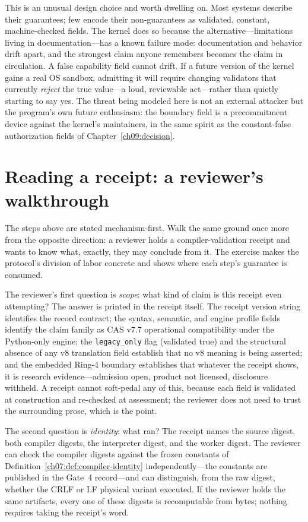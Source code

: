 This is an unusual design choice and worth dwelling on. Most systems describe their guarantees; few encode their non-guarantees as validated, constant, machine-checked fields. The kernel does so because the alternative---limitations living in documentation---has a known failure mode: documentation and behavior drift apart, and the strongest claim anyone remembers becomes the claim in circulation. A false capability field cannot drift. If a future version of the kernel gains a real OS sandbox, admitting it will require changing validators that currently \emph{reject} the true value---a loud, reviewable act---rather than quietly starting to say yes. The threat being modeled here is not an external attacker but the program's own future enthusiasm: the boundary field is a precommitment device against the kernel's maintainers, in the same spirit as the constant-false authorization fields of Chapter~\ref{ch09:decision}.

\section{Reading a receipt: a reviewer's walkthrough}\label{ch07:walkthrough}

The steps above are stated mechanism-first. Walk the same ground once more from the opposite direction: a reviewer holds a compiler-validation receipt and wants to know what, exactly, they may conclude from it. The exercise makes the protocol's division of labor concrete and shows where each step's guarantee is consumed.

The reviewer's first question is \emph{scope}: what kind of claim is this receipt even attempting? The answer is printed in the receipt itself. The receipt version string identifies the record contract; the syntax, semantic, and engine profile fields identify the claim family as CAS v7.7 operational compatibility under the Python-only engine; the \texttt{legacy\_only} flag (validated true) and the structural absence of any v8 translation field establish that no v8 meaning is being asserted; and the embedded Ring-4 boundary establishes that whatever the receipt shows, it is research evidence---admission open, product not licensed, disclosure withheld. A receipt cannot soft-pedal any of this, because each field is validated at construction and re-checked at assessment; the reviewer does not need to trust the surrounding prose, which is the point.

The second question is \emph{identity}: what ran? The receipt names the source digest, both compiler digests, the interpreter digest, and the worker digest. The reviewer can check the compiler digests against the frozen constants of Definition~\ref{ch07:def:compiler-identity} independently---the constants are published in the Gate~4 record---and can distinguish, from the raw digest, whether the CRLF or LF physical variant executed. If the reviewer holds the same artifacts, every one of these digests is recomputable from bytes; nothing requires taking the receipt's word.

